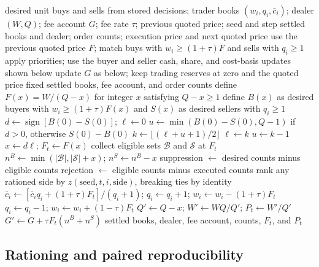 \begin{algorithm}[!ht]
\caption{Reserve clearing at a common base price without a cost-basis restriction.
The binary search found the greatest supported integer net purchase in
the direction of initial excess demand. The baseline uses $\tau=0$.}
\label{alg:dealer-clearing}
\begin{algorithmic}[1]
\REQUIRE desired unit buys and sells from stored decisions; trader books
$(w_i,q_i,\bar c_i)$; dealer $(W,Q)$; fee account $G$; fee rate $\tau$;
previous quoted price; seed and step
\ENSURE settled books and dealer; order counts; execution price and next
quoted price
 \STATE use the previous quoted price $F$; match buys with
 $w_i\geq(1+\tau)F$ and sells with $q_i\geq1$
 \STATE apply priorities; use the buyer and seller cash, share, and cost-basis updates shown below
 \STATE update $G$ as below; keep trading reserves at zero and the
 quoted price fixed
 \RETURN settled books, fee account, and order counts
\ENDIF
\STATE define $F(x)=W/(Q-x)$ for integer $x$ satisfying $Q-x\geq1$
\STATE define $B(x)$ as desired buyers with $w_i\geq(1+\tau)F(x)$ and $S(x)$ as desired sellers with $q_i\geq1$
\STATE $d\leftarrow\operatorname{sign}[B(0)-S(0)]$; $\ell\leftarrow0$
\STATE $u\leftarrow\min(B(0)-S(0),Q-1)$ if $d>0$, otherwise $S(0)-B(0)$
 \STATE $k\leftarrow\lfloor(\ell+u+1)/2\rfloor$
  \STATE $\ell\leftarrow k$
 \ELSE
  \STATE $u\leftarrow k-1$
 \ENDIF
\ENDWHILE
\STATE $x\leftarrow d\ell$; $F_t\leftarrow F(x)$
\STATE collect eligible sets $\mathcal{B}$ and $\mathcal{S}$ at $F_t$
\STATE $n^B\leftarrow\min(|\mathcal{B}|,|\mathcal{S}|+x)$; $n^S\leftarrow n^B-x$
\STATE suppression $\leftarrow$ desired counts minus eligible counts
\STATE rejection $\leftarrow$ eligible counts minus executed counts
\STATE rank any rationed side by $z(\mathrm{seed},t,i,\mathrm{side})$, breaking ties by identity
 \STATE $\bar c_i\leftarrow[\bar c_iq_i+(1+\tau)F_t]/(q_i+1)$;
 $q_i\leftarrow q_i+1$; $w_i\leftarrow w_i-(1+\tau)F_t$
\ENDFOR
{}
 \STATE $q_i\leftarrow q_i-1$; $w_i\leftarrow w_i+(1-\tau)F_t$
\ENDFOR
\STATE $Q'\leftarrow Q-x$; $W'\leftarrow WQ/Q'$; $P_t\leftarrow W'/Q'$
\STATE $G'\leftarrow G+\tau F_t(n^B+n^S)$
\RETURN settled books, dealer, fee account, counts, $F_t$, and $P_t$
\end{algorithmic}
\end{algorithm}

\FloatBarrier

\subsection{Rationing and paired reproducibility}

